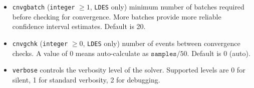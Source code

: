 \begin{itemize}
\item \texttt{cnvgbatch} (\texttt{integer} $\geq 1$, \texttt{LDES} only) minimum number of batches required before checking for convergence. More batches provide more reliable confidence interval estimates. Default is 20.

\item \texttt{cnvgchk} (\texttt{integer} $\geq 0$, \texttt{LDES} only) number of events between convergence checks. A value of 0 means auto-calculate as $\mathtt{samples}/50$. Default is 0 (auto).

\item \texttt{verbose} controls the verbosity level of the solver. Supported levels are 0 for silent, 1 for standard verbosity, 2 for debugging.
\end{itemize}

\begin{MATLAB}
\begin{table}[t!]
\caption{Default values of the \textsc{Line} solver options and their default assignments (MATLAB)}
\renewcommand{\arraystretch}{1.1}
\centering
\scriptsize
{}
\end{table}
\end{MATLAB}
